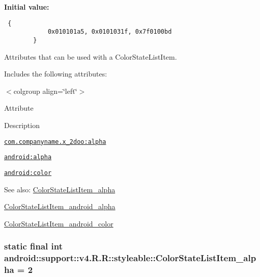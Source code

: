 \textbf{Initial value:}

\begin{Code}\begin{verbatim} {
            0x010101a5, 0x0101031f, 0x7f0100bd
        }
\end{verbatim}
\end{Code}
Attributes that can be used with a ColorStateListItem. 

Includes the following attributes: \begin{TabularC}{0}
\hline
\end{TabularC}
$<$colgroup align=\char`\"{}left\char`\"{}$>$ 

Attribute

Description 

{\tt \hyperlink{classandroid_1_1support_1_1v4_1_1_r_1_1styleable_92c3b7f9f52eb178ae6c53c479c310a1}{com.companyname.x\_\-2doo:alpha}}

{\tt \hyperlink{classandroid_1_1support_1_1v4_1_1_r_1_1styleable_022a829047dedadde86b69a4e39c03b9}{android:alpha}}

{\tt \hyperlink{classandroid_1_1support_1_1v4_1_1_r_1_1styleable_b79c06c660ce3527b4a6be6d89f1f6c4}{android:color}}

\begin{Desc}
\item[See also:]\hyperlink{classandroid_1_1support_1_1v4_1_1_r_1_1styleable_92c3b7f9f52eb178ae6c53c479c310a1}{ColorStateListItem\_\-alpha} 

\hyperlink{classandroid_1_1support_1_1v4_1_1_r_1_1styleable_022a829047dedadde86b69a4e39c03b9}{ColorStateListItem\_\-android\_\-alpha} 

\hyperlink{classandroid_1_1support_1_1v4_1_1_r_1_1styleable_b79c06c660ce3527b4a6be6d89f1f6c4}{ColorStateListItem\_\-android\_\-color} \end{Desc}
\hypertarget{classandroid_1_1support_1_1v4_1_1_r_1_1styleable_92c3b7f9f52eb178ae6c53c479c310a1}{
\subsubsection[{ColorStateListItem\_\-alpha}]{\setlength{\rightskip}{0pt plus 5cm}static final int android::support::v4.R.R::styleable::ColorStateListItem\_\-alpha = 2}}
\label{classandroid_1_1support_1_1v4_1_1_r_1_1styleable_92c3b7f9f52eb178ae6c53c479c310a1}



